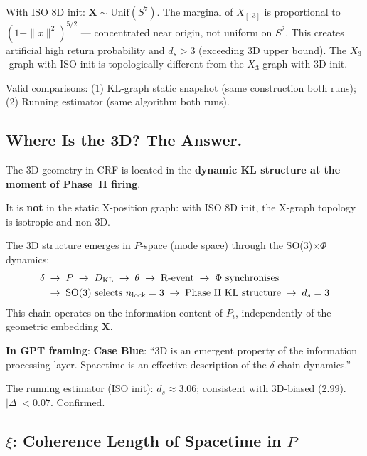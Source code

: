 \documentclass[12pt, a4paper]{article}
\begin{document}
\begin{keybox}[title={$X$-Graph Measurements Not Portable Across Initialisations}]
With ISO 8D init: $\mathbf{X}\sim\text{Unif}(S^7)$. The marginal of $X_{[:3]}$ is proportional to $(1-\|x\|^2)^{5/2}$ --- concentrated near origin, not uniform on $S^2$. This creates artificial high return probability and $d_s>3$ (exceeding 3D upper bound). The $X_3$-graph with ISO init is topologically different from the $X_3$-graph with 3D init.

Valid comparisons: (1) KL-graph static snapshot (same construction both runs); (2) Running estimator (same algorithm both runs).
\end{keybox}

\subsection{Where Is the 3D? The Answer.}

\begin{formalbox}[title={Answer: Dynamic Information Space, Not Static Position}]
The 3D geometry in CRF is located in the \textbf{dynamic KL structure at the moment of Phase~II firing}.

It is \textbf{not} in the static X-position graph: with ISO 8D init, the X-graph topology is isotropic and non-3D.

The 3D structure emerges in $P$-space (mode space) through the SO(3)$\times\Phi$ dynamics:
\begin{align*}
  \delta &\;\to\; P \;\to\; D_{\rm KL} \;\to\; \theta \;\to\; \text{R-event} \;\to\; \Phi\text{ synchronises}\\
  &\;\to\; \text{SO(3) selects }n_{\rm lock}=3 \;\to\; \text{Phase~II KL structure} \;\to\; d_s=3
\end{align*}
This chain operates on the information content of $P_i$, independently of the geometric embedding $\mathbf{X}$.

\textbf{In GPT framing}: \textbf{Case Blue}: ``3D is an emergent property of the information processing layer. Spacetime is an effective description of the $\delta$-chain dynamics.''

The running estimator (ISO init): $d_s\approx 3.06$; consistent with 3D-biased ($2.99$). $|\Delta|<0.07$. Confirmed.
\end{formalbox}

\subsection{$\xi$: Coherence Length of Spacetime in $P$}
\end{document}
